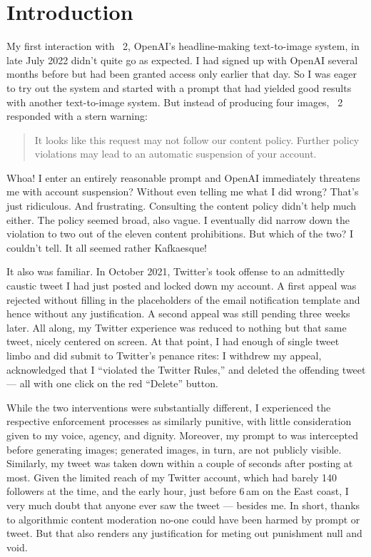 
\section{Introduction}
\label{sec:introduction}

My first interaction with \DALLE~2, OpenAI's headline-making text-to-image
system, in late July 2022 didn't quite go as expected. I had signed up with
OpenAI several months before but had been granted access only earlier that day.
So I was eager to try out the system and started with a prompt that had yielded
good results with another text-to-image system. But instead of producing four
images, \DALLE~2 responded with a stern warning:

\begin{quote}
\openfatdquo{}It looks like this request may not follow our content policy.
Further policy violations may lead to an automatic suspension of your
account.\closefatdquo{}
\end{quote}

\noindent Whoa! I enter an entirely reasonable prompt and OpenAI immediately
threatens me with account suspension? Without even telling me what I did wrong?
That's just ridiculous. And frustrating. Consulting the content policy didn't
help much either. The policy seemed broad, also vague. I eventually did narrow
down the violation to two out of the eleven content prohibitions. But which of
the two? I couldn't tell. It all seemed rather Kafkaesque!

It also was familiar. In October 2021, Twitter's \AI{} took offense to an
admittedly caustic tweet I had just posted and locked down my account. A first
appeal was rejected without filling in the placeholders of the email
notification template and hence without any justification. A second appeal was
still pending three weeks later. All along, my Twitter experience was reduced to
nothing but that same tweet, nicely centered on screen. At that point, I had
enough of single tweet limbo and did submit to Twitter's penance rites: I
withdrew my appeal, acknowledged that I ``violated the Twitter Rules,'' and
deleted the offending tweet --- all with one click on the red ``Delete'' button.

While the two interventions were substantially different, I experienced the
respective enforcement processes as similarly punitive, with little
consideration given to my voice, agency, and dignity. Moreover, my prompt to
\DALLE{} was intercepted before generating images; generated images, in turn, are
not publicly visible. Similarly, my tweet was taken down within a couple of
seconds after posting at most. Given the limited reach of my Twitter account,
which had barely 140 followers at the time, and the early hour, just before
6$\,$am on the East coast, I very much doubt that anyone ever saw the tweet ---
besides me. In short, thanks to algorithmic content moderation no-one could have
been harmed by prompt or tweet. But that also renders any justification for
meting out punishment null and void.

